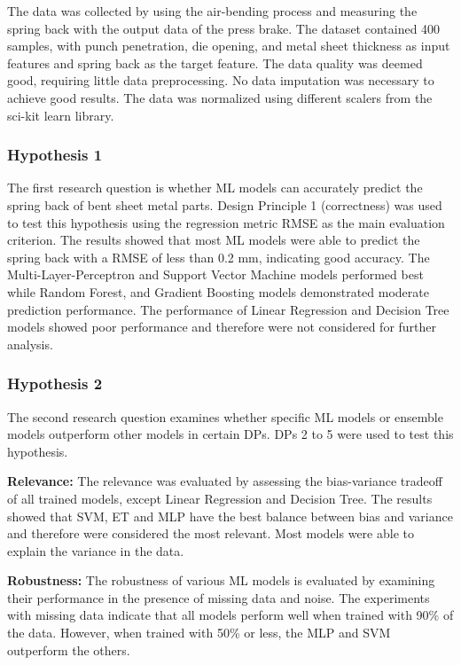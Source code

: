 The data was collected by using the air-bending process and measuring the spring back with the output data of the
press brake.
The dataset contained 400 samples, with punch penetration, die opening, and metal sheet thickness as
input features and spring back as the target feature.
The data quality was deemed good, requiring little data preprocessing.
No data imputation was necessary to achieve good results.
The data was normalized using different scalers from the sci-kit learn library.


\subsubsection{Hypothesis 1}

The first research question is whether ML models can accurately predict the spring back of bent sheet metal parts.
Design Principle 1 (correctness) was used to test this hypothesis using the regression metric RMSE as the main
evaluation criterion.
The results showed that most ML models were able to predict the spring back with a RMSE of less
than 0.2 mm, indicating good accuracy.
The Multi-Layer-Perceptron and Support Vector Machine models performed best while Random Forest, and Gradient
Boosting models
demonstrated
moderate prediction
performance.
The performance of Linear Regression and Decision Tree models showed poor performance and
therefore were not considered for further analysis.


\subsubsection{Hypothesis 2}

The second research question examines whether specific ML models or ensemble models outperform other models in certain
\ac{DP}s.
\ac{DP}s 2 to 5 were used to test this hypothesis.

\textbf{Relevance:} The relevance was evaluated by assessing the bias-variance tradeoff of all trained models, except
Linear Regression and
Decision Tree.
The results showed that \ac{SVM}, \ac{ET} and \ac{MLP} have the best balance
between bias and variance and therefore were considered the most relevant.
Most models were able to explain the variance in the data.


\textbf{Robustness:} The robustness of various ML models is evaluated by examining their performance in the presence of
missing data and noise.
The experiments with missing data indicate that all models perform well when trained with 90\% of the data.
However, when trained with 50\% or less, the MLP and SVM outperform the others.

